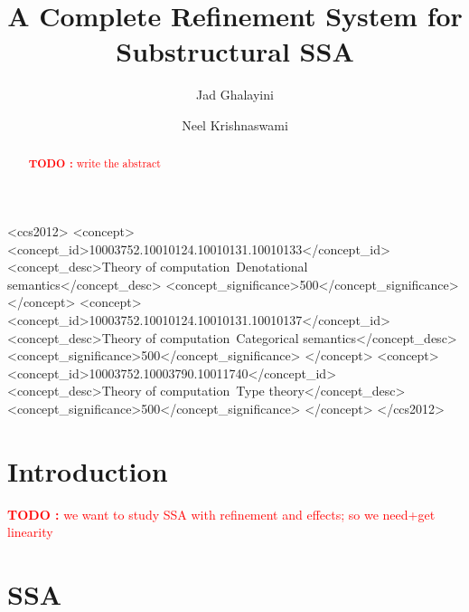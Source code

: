 \documentclass[acmsmall,screen,review]{acmart}
\newcounter{todos}
\newcommand{\TODO}[1]{{
  \stepcounter{todos}
  \begin{center}\large{\textcolor{red}{\textbf{TODO \arabic{todos}:} #1}}\end{center}
}}
\begin{document}
\title{A Complete Refinement System for Substructural SSA}

\author{Jad Ghalayini}

\author{Neel Krishnaswami}

\begin{abstract}
  \TODO{write the abstract}
\end{abstract}

\begin{CCSXML}
  <ccs2012>
  <concept>
  <concept_id>10003752.10010124.10010131.10010133</concept_id>
  <concept_desc>Theory of computation~Denotational semantics</concept_desc>
  <concept_significance>500</concept_significance>
  </concept>
  <concept>
  <concept_id>10003752.10010124.10010131.10010137</concept_id>
  <concept_desc>Theory of computation~Categorical semantics</concept_desc>
  <concept_significance>500</concept_significance>
  </concept>
  <concept>
  <concept_id>10003752.10003790.10011740</concept_id>
  <concept_desc>Theory of computation~Type theory</concept_desc>
  <concept_significance>500</concept_significance>
  </concept>
  </ccs2012>
\end{CCSXML}




\maketitle

\section{Introduction}

\TODO{we want to study SSA with refinement and effects; so we need+get linearity}

\section{SSA}
\end{document}
